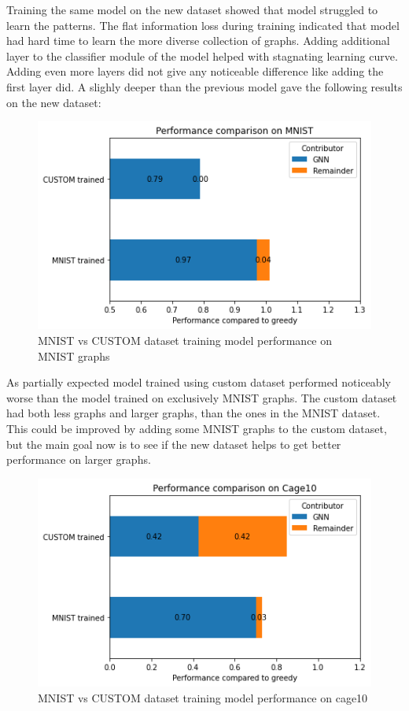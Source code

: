 Training the same model on the new dataset showed that model struggled to learn the patterns. The flat information loss during training indicated that model had hard time to learn the more diverse collection of graphs. Adding additional layer to the classifier module of the model helped with stagnating learning curve. Adding even more layers did not give any noticeable difference like adding the first layer did. A slighly deeper than the previous model gave the following results on the new dataset:

\begin{figure}[H]
    \centering
    \includegraphics[scale=1.0]{figures/MNISTvsCUSTOMonMNIST}
    \caption{MNIST vs CUSTOM dataset training model performance on MNIST graphs}
    \label{models performance comparison}
\end{figure}

As partially expected model trained using custom dataset performed noticeably worse than the model trained on exclusively MNIST graphs. The custom dataset had both less graphs and larger graphs, than the ones in the MNIST dataset. This could be improved by adding some MNIST graphs to the custom dataset, but the main goal now is to see if the new dataset helps to get better performance on larger graphs. 

\begin{figure}[H]
    \centering
    \includegraphics[scale=1.0]{figures/MNSITvsCUSTOMonCage10}
    \caption{MNIST vs CUSTOM dataset training model performance on cage10}
    \label{models performance comparison}
\end{figure}

